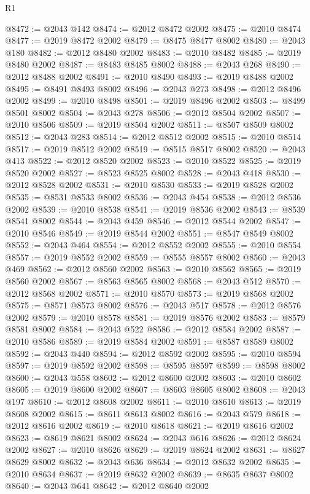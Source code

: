 \begin{lexlean}{R1}
\begin{coremodule}
@8472 := @2043 @142
@8474 := @2012 @8472 @2002
@8475 := @2010 @8474
@8477 := @2019 @8472 @2002
@8479 := @8475 @8477 @8002
@8480 := @2043 @180
@8482 := @2012 @8480 @2002
@8483 := @2010 @8482
@8485 := @2019 @8480 @2002
@8487 := @8483 @8485 @8002
@8488 := @2043 @268
@8490 := @2012 @8488 @2002
@8491 := @2010 @8490
@8493 := @2019 @8488 @2002
@8495 := @8491 @8493 @8002
@8496 := @2043 @273
@8498 := @2012 @8496 @2002
@8499 := @2010 @8498
@8501 := @2019 @8496 @2002
@8503 := @8499 @8501 @8002
@8504 := @2043 @278
@8506 := @2012 @8504 @2002
@8507 := @2010 @8506
@8509 := @2019 @8504 @2002
@8511 := @8507 @8509 @8002
@8512 := @2043 @283
@8514 := @2012 @8512 @2002
@8515 := @2010 @8514
@8517 := @2019 @8512 @2002
@8519 := @8515 @8517 @8002
@8520 := @2043 @413
@8522 := @2012 @8520 @2002
@8523 := @2010 @8522
@8525 := @2019 @8520 @2002
@8527 := @8523 @8525 @8002
@8528 := @2043 @418
@8530 := @2012 @8528 @2002
@8531 := @2010 @8530
@8533 := @2019 @8528 @2002
@8535 := @8531 @8533 @8002
@8536 := @2043 @454
@8538 := @2012 @8536 @2002
@8539 := @2010 @8538
@8541 := @2019 @8536 @2002
@8543 := @8539 @8541 @8002
@8544 := @2043 @459
@8546 := @2012 @8544 @2002
@8547 := @2010 @8546
@8549 := @2019 @8544 @2002
@8551 := @8547 @8549 @8002
@8552 := @2043 @464
@8554 := @2012 @8552 @2002
@8555 := @2010 @8554
@8557 := @2019 @8552 @2002
@8559 := @8555 @8557 @8002
@8560 := @2043 @469
@8562 := @2012 @8560 @2002
@8563 := @2010 @8562
@8565 := @2019 @8560 @2002
@8567 := @8563 @8565 @8002
@8568 := @2043 @512
@8570 := @2012 @8568 @2002
@8571 := @2010 @8570
@8573 := @2019 @8568 @2002
@8575 := @8571 @8573 @8002
@8576 := @2043 @517
@8578 := @2012 @8576 @2002
@8579 := @2010 @8578
@8581 := @2019 @8576 @2002
@8583 := @8579 @8581 @8002
@8584 := @2043 @522
@8586 := @2012 @8584 @2002
@8587 := @2010 @8586
@8589 := @2019 @8584 @2002
@8591 := @8587 @8589 @8002
@8592 := @2043 @440
@8594 := @2012 @8592 @2002
@8595 := @2010 @8594
@8597 := @2019 @8592 @2002
@8598 := @8595 @8597
@8599 := @8598 @8002
@8600 := @2043 @558
@8602 := @2012 @8600 @2002
@8603 := @2010 @8602
@8605 := @2019 @8600 @2002
@8607 := @8603 @8605 @8002
@8608 := @2043 @197
@8610 := @2012 @8608 @2002
@8611 := @2010 @8610
@8613 := @2019 @8608 @2002
@8615 := @8611 @8613 @8002
@8616 := @2043 @579
@8618 := @2012 @8616 @2002
@8619 := @2010 @8618
@8621 := @2019 @8616 @2002
@8623 := @8619 @8621 @8002
@8624 := @2043 @616
@8626 := @2012 @8624 @2002
@8627 := @2010 @8626
@8629 := @2019 @8624 @2002
@8631 := @8627 @8629 @8002
@8632 := @2043 @636
@8634 := @2012 @8632 @2002
@8635 := @2010 @8634
@8637 := @2019 @8632 @2002
@8639 := @8635 @8637 @8002
@8640 := @2043 @641
@8642 := @2012 @8640 @2002

\end{coremodule}
\end{lexlean}
